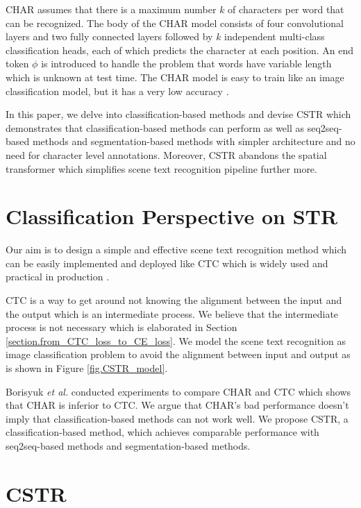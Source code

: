 \documentclass[final]{cvpr}
\begin{document}
CHAR \cite{jaderberg14c} assumes that there is a maximum number $k$ of characters per word  that can be recognized.
The body of the CHAR model consists of four convolutional layers and two fully connected layers followed by $k$ independent multi-class classification heads, each of which predicts the character at each position. An end token $\phi$ is introduced to handle the problem that words have variable length which is unknown at test time.
The CHAR model is easy to train like an image classification model, but it has a very low accuracy \cite{borisyuk2018rosetta}.

In this paper, we delve into classification-based methods and devise CSTR which demonstrates that classification-based methods can perform as well as seq2seq-based methods and segmentation-based methods with simpler architecture and no need for character level annotations. Moreover, CSTR abandons the spatial transformer which simplifies scene text recognition pipeline further more.

\section{Classification Perspective on STR}

Our aim is to design a simple and effective scene text recognition method which can be easily implemented and deployed like CTC which is widely used and practical in production \cite{borisyuk2018rosetta, du2020pp}.

CTC is a way to get around not knowing the alignment between the input and the output which is an intermediate process. We believe that the intermediate process is not necessary which is elaborated in Section \ref{section.from_CTC_loss_to_CE_loss}. We model the scene text recognition as image classification problem to avoid the alignment between input and output as is shown in Figure \ref{fig.CSTR_model}.

Borisyuk \textit{et al.} \cite{borisyuk2018rosetta} conducted experiments to compare CHAR \cite{jaderberg14c} and CTC which shows that CHAR is inferior to CTC. We argue that CHAR's bad performance doesn't imply that classification-based methods can not work well. We propose CSTR, a classification-based method, which achieves comparable performance with seq2seq-based methods and segmentation-based methods.

\section{CSTR}
\end{document}
